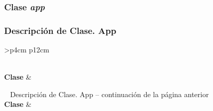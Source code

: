 \subsubsection{Clase \textit{app}}
\subsubsection{Descripción de Clase. App} \label{sec:descripcion_app}
\begin{longtable}{
    >{}p{4cm}
    p{12cm}
    }
    \caption{Descripción de Clase. App} \label{table:descripcion_app} \\
    \toprule
    \textbf{Clase} &  \\
    \endfirsthead
    
    {{ \tablename\ \thetable{} Descripción de Clase. App -- continuación de la página anterior}} \\
    \toprule
    \textbf{Clase} &  \\
    \midrule
    \endhead
    
    \midrule
     \\ 
    \endfoot
    
    \bottomrule
    \endlastfoot
    

\end{longtable}
